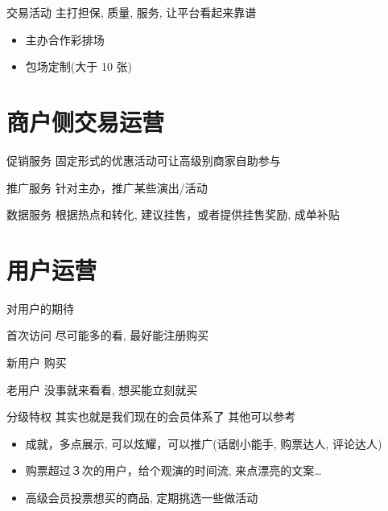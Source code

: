 \documentclass[presentation,bigger]{beamer}
\begin{document}
\begin{frame}[label={sec:orgheadline6}]{交易活动}
主打担保, 质量, 服务, 让平台看起来靠谱
\begin{itemize}
\item 主办合作彩排场
\item 包场定制(大于 10 张)
\end{itemize}
\end{frame}

\section{商户侧交易运营}
\label{sec:orgheadline11}
\begin{frame}[label={sec:orgheadline8}]{促销服务}
固定形式的优惠活动可让高级别商家自助参与
\end{frame}
\begin{frame}[label={sec:orgheadline9}]{推广服务}
针对主办，推广某些演出/活动
\end{frame}
\begin{frame}[label={sec:orgheadline10}]{数据服务}
根据热点和转化, 建议挂售，或者提供挂售奖励, 成单补贴
\end{frame}

\section{用户运营}
\label{sec:orgheadline14}
\begin{frame}[label={sec:orgheadline12}]{对用户的期待}
\begin{block}{首次访问}
尽可能多的看, 最好能注册购买
\end{block}
\begin{block}{新用户}
购买
\end{block}
\begin{block}{老用户}
没事就来看看, 想买能立刻就买
\end{block}
\end{frame}

\begin{frame}[label={sec:orgheadline13}]{分级特权}
其实也就是我们现在的会员体系了
其他可以参考
\begin{itemize}
\item 成就，多点展示, 可以炫耀，可以推广(话剧小能手, 购票达人, 评论达人)
\item 购票超过３次的用户，给个观演的时间流, 来点漂亮的文案\ldots{}
\item 高级会员投票想买的商品, 定期挑选一些做活动
\end{itemize}
\end{frame}
\end{document}

